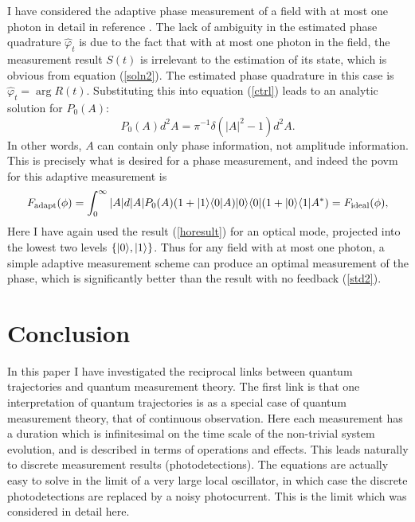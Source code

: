 \documentclass[12pt]{article}
\begin{document}
I have considered the adaptive phase measurement of a field with at most one photon
in detail in reference \cite{Wis95prl}. The lack of ambiguity in the estimated
phase quadrature $\hat\varphi_t$ is due to the fact that with at most one photon
in the field, the measurement result $S(t)$ is irrelevant to the
estimation of its state, which is obvious from equation (\ref{soln2}). The estimated
phase quadrature in this case is $\hat\varphi_t = \arg R(t)$. Substituting this
into equation (\ref{ctrl}) leads to an analytic solution for $P_0(A)$:
\begin{equation}
P_0(A)d^2A = \pi^{-1} \delta(|A|^2 - 1)d^2A.
\end{equation}
In other words, $A$ can contain only phase information, not amplitude information.
This is precisely what is desired for a phase measurement, and indeed the {\sc povm} for
this adaptive measurement is \begin{equation}
{F}_{\rm adapt}(\phi) = \int_0^\infty |A| d|A|
P_0(A) (1+| {1} \rangle\langle {0} | A) | {0} \rangle\langle {0} | (1+| {0} \rangle\langle {1} | A^*) = {F}_{\rm ideal}(\phi),
\end{equation} Here I have again used the result (\ref{horesult}) for an optical
mode, projected into the lowest two levels $\{| {0} \rangle,| {1} \rangle\}$. Thus for any
field with at most one photon,  a simple adaptive measurement scheme can produce an
optimal measurement of the phase, which is significantly better than the result
with no feedback (\ref{std2}).

\section{Conclusion}

In this paper I have investigated the reciprocal links between quantum
trajectories and quantum measurement theory. The first link is that one
interpretation of quantum trajectories is as a special case of quantum
measurement theory, that of continuous observation. Here each measurement
has a duration which is infinitesimal on the time scale of the non-trivial system
evolution, and is described in terms of operations and effects.
This leads naturally to discrete measurement results (photodetections). The
equations are actually easy to solve in the limit of a very large local
oscillator, in which case the discrete photodetections are replaced by a noisy
photocurrent. This is the limit which was considered in detail here.
\end{document}
